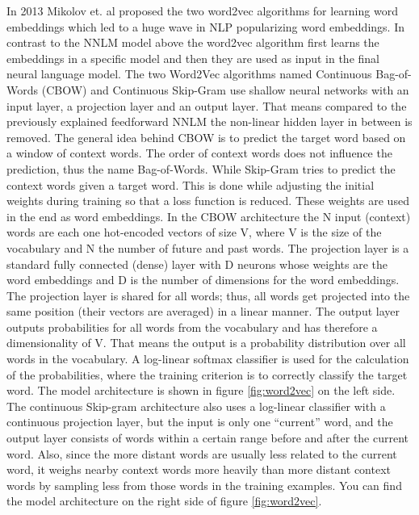 \documentclass[]{krantz}
\begin{document}
In 2013 Mikolov et. al proposed the two word2vec algorithms for learning word embeddings which led to a huge wave in NLP popularizing word embeddings. In contrast to the NNLM model above the word2vec algorithm first learns the embeddings in a specific model and then they are used as input in the final neural language model. The two Word2Vec algorithms named Continuous Bag-of-Words (CBOW) and Continuous Skip-Gram use shallow neural networks with an input layer, a projection layer and an output layer. That means compared to the previously explained feedforward NNLM the non-linear hidden layer in between is removed.
The general idea behind CBOW is to predict the target word based on a window of context words. The order of context words does not influence the prediction, thus the name Bag-of-Words. While Skip-Gram tries to predict the context words given a target word. This is done while adjusting the initial weights during training so that a loss function is reduced. These weights are used in the end as word embeddings.
In the CBOW architecture the N input (context) words are each one hot-encoded vectors of size V, where V is the size of the vocabulary and N the number of future and past words. The projection layer is a standard fully connected (dense) layer with D neurons whose weights are the word embeddings and D is the number of dimensions for the word embeddings. The projection layer is shared for all words; thus, all words get projected into the same position (their vectors are averaged) in a linear manner. The output layer outputs probabilities for all words from the vocabulary and has therefore a dimensionality of V. That means the output is a probability distribution over all words in the vocabulary. A log-linear softmax classifier is used for the calculation of the probabilities, where the training criterion is to correctly classify the target word. The model architecture is shown in figure \ref{fig:word2vec} on the left side.
The continuous Skip-gram architecture also uses a log-linear classifier with a continuous projection layer, but the input is only one ``current'' word, and the output layer consists of words within a certain range before and after the current word. Also, since the more distant words are usually less related to the current word, it weighs nearby context words more heavily than more distant context words by sampling less from those words in the training examples. You can find the model architecture on the right side of figure \ref{fig:word2vec}.
\end{document}
